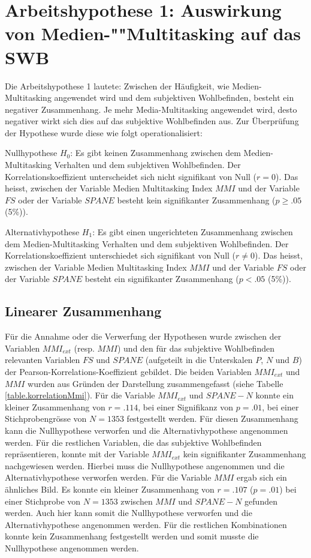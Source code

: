 \section{Arbeitshypothese 1: Auswirkung von Medien-""Multitasking auf das SWB}\label{label.ergebnisse.arbeitshypothese1}
Die Arbeitshypothese 1 lautete: Zwischen der Häufigkeit, wie Medien-Multitasking angewendet wird und dem subjektiven Wohlbefinden, besteht ein negativer Zusammenhang. Je mehr Media-Multitasking angewendet wird, desto negativer wirkt sich dies auf das subjektive Wohlbefinden aus. Zur Überprüfung der Hypothese wurde diese wie folgt operationalisiert:
\par
Nullhypothese $H_{0}$: Es gibt keinen Zusammenhang zwischen dem Medien-Multitasking Verhalten und dem subjektiven Wohlbefinden. Der Korrelationskoeffizient unterscheidet sich nicht signifikant von Null ($r=0$). Das heisst, zwischen der Variable Medien Multitasking Index $MMI$ und der Variable $FS$ oder der Variable $SPANE$  besteht kein signifikanter Zusammenhang ($p \geq .05$ (5\%)).
\par
Alternativhypothese $H_{1}$: Es gibt einen ungerichteten Zusammenhang zwischen dem Medien-Multitasking Verhalten und dem subjektiven Wohlbefinden. Der Korrelationskoeffizient unterschiedet sich signifikant von Null ($r \neq 0$). Das heisst, zwischen der Variable Medien Multitasking Index $MMI$ und der Variable $FS$ oder der Variable $SPANE$ besteht ein signifikanter Zusammenhang ($p < .05$ (5\%)).

\subsection{Linearer Zusammenhang}
Für die Annahme oder die Verwerfung der Hypothesen wurde zwischen der Variablen $MMI_{ext}$ (resp. $MMI$) und den für das subjektive Wohlbefinden relevanten Variablen $FS$ und $SPANE$ (aufgeteilt in die Unterskalen $P$, $N$ und $B$) der Pearson-Korrelations-Koeffizient gebildet. Die beiden Variablen $MMI_{ext}$ und $MMI$ wurden aus Gründen der Darstellung zusammengefasst (siehe Tabelle \ref{table.korrelationMmi}). Für die Variable $MMI_{ext}$ und $SPANE-N$ konnte ein kleiner Zusammenhang von $r=.114$, bei einer Signifikanz von $p=.01$, bei einer Stichprobengrösse von $N=1353$ festgestellt werden. Für diesen Zusammenhang kann die Nullhypothese verworfen und die Alternativhypothese angenommen werden. Für die restlichen Variablen, die das subjektive Wohlbefinden repräsentieren, konnte mit der Variable $MMI_{ext}$ kein signifikanter Zusammenhang nachgewiesen werden. Hierbei muss die Nullhypothese angenommen und die Alternativhypothese verworfen werden. Für die Variable $MMI$ ergab sich ein ähnliches Bild. Es konnte ein kleiner Zusammenhang von $r=.107$ ($p=.01$) bei einer Stichprobe von $N=1353$ zwischen $MMI$ und $SPANE-N$ gefunden werden. Auch hier kann somit die Nullhypothese verworfen und die Alternativhypothese angenommen werden. Für die restlichen Kombinationen konnte kein Zusammenhang festgestellt werden und somit musste die Nullhypothese angenommen werden.


